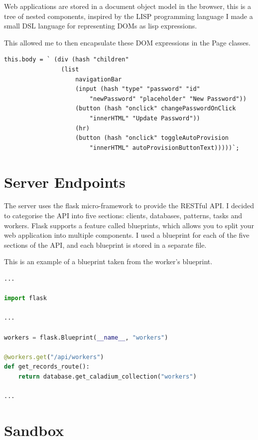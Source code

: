 Web applications are stored in a document object model in the browser, this is a tree of nested components, inspired by the LISP programming language I made a small DSL language for representing DOMs as lisp expressions.

This allowed me to then encapsulate these DOM expressions in the Page classes.

\begin{lstlisting}
this.body = ` (div (hash "children"
                (list
                    navigationBar
                    (input (hash "type" "password" "id"
                        "newPassword" "placeholder" "New Password"))
                    (button (hash "onclick" changePasswordOnClick
                        "innerHTML" "Update Password"))
                    (hr)
                    (button (hash "onclick" toggleAutoProvision
                        "innerHTML" autoProvisionButtonText)))))`;
\end{lstlisting}


\section{Server Endpoints}
The server uses the flask micro-framework to provide the RESTful API.
I decided to categorise the API into five sections: clients, databases, patterns, tasks and workers.
Flask supports a feature called blueprints, which allows you to split your web application into multiple components.
I used a blueprint for each of the five sections of the API, and each blueprint is stored in a separate file.

This is an example of a blueprint taken from the worker's blueprint.
\begin{lstlisting}[language=python]
...

import flask

...

workers = flask.Blueprint(__name__, "workers")

@workers.get("/api/workers")
def get_records_route():
    return database.get_caladium_collection("workers")

...
\end{lstlisting}

\section{Sandbox}



